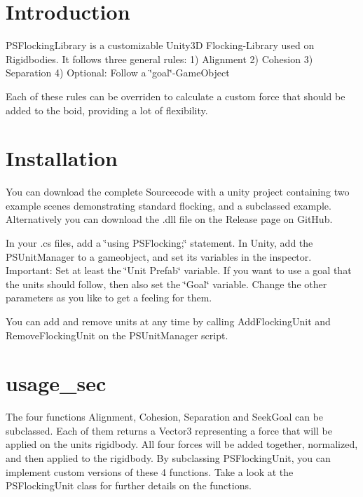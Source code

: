 \hypertarget{index_intro_sec}{}\section{Introduction}\label{index_intro_sec}
P\+S\+Flocking\+Library is a customizable Unity3D Flocking-\/\+Library used on Rigidbodies. It follows three general rules\+: 1) Alignment 2) Cohesion 3) Separation 4) Optional\+: Follow a \char`\"{}goal\char`\"{}-\/\+Game\+Object

Each of these rules can be overriden to calculate a custom force that should be added to the boid, providing a lot of flexibility.\hypertarget{index_install_sec}{}\section{Installation}\label{index_install_sec}
You can download the complete Sourcecode with a unity project containing two example scenes demonstrating standard flocking, and a subclassed example. Alternatively you can download the .dll file on the Release page on Git\+Hub.

In your .cs files, add a \char`\"{}using P\+S\+Flocking;\char`\"{} statement. In Unity, add the P\+S\+Unit\+Manager to a gameobject, and set its variables in the inspector. Important\+: Set at least the \char`\"{}\+Unit Prefab\char`\"{} variable. If you want to use a goal that the units should follow, then also set the \char`\"{}\+Goal\char`\"{} variable. Change the other parameters as you like to get a feeling for them.

You can add and remove units at any time by calling Add\+Flocking\+Unit and Remove\+Flocking\+Unit on the P\+S\+Unit\+Manager script.\hypertarget{index_usage_sec}{}\section{usage\+\_\+sec}\label{index_usage_sec}
The four functions Alignment, Cohesion, Separation and Seek\+Goal can be subclassed. Each of them returns a Vector3 representing a force that will be applied on the unit\textquotesingle{}s rigidbody. All four forces will be added together, normalized, and then applied to the rigidbody. By subclassing P\+S\+Flocking\+Unit, you can implement custom versions of these 4 functions. Take a look at the P\+S\+Flocking\+Unit class for further details on the functions. 